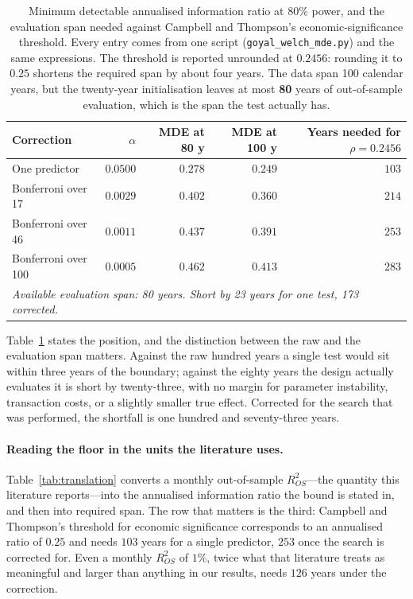 \documentclass{article}
\theoremstyle{plain}
\theoremstyle{definition}
\newcommand{\rsq}{R^2_{OS}}
\begin{document}
\begin{table}[t]
  \centering
  \caption{Minimum detectable annualised information ratio at $80\%$ power, and the evaluation
  span needed against Campbell and Thompson's economic-significance threshold. Every entry comes
  from one script (\texttt{goyal\_welch\_mde.py}) and the same expressions. The threshold is
  reported unrounded at $0.2456$: rounding it to $0.25$ shortens the required span by about four
  years. The data span 100 calendar years, but the twenty-year initialisation leaves at most
  \textbf{80} years of out-of-sample evaluation, which is the span the test actually has.}
  \label{tab:floor}
  \small
  \begin{tabular}{lrrrr}
    \toprule
    Correction & $\alpha$ & MDE at 80 y & MDE at 100 y & Years needed for $\rho=0.2456$ \\
    \midrule
    One predictor                  & $0.0500$ & $0.278$ & $0.249$ & $103$ \\
    Bonferroni over 17 \citep{welch2008} & $0.0029$ & $0.402$ & $0.360$ & $214$ \\
    Bonferroni over 46 \citep{goyal2024} & $0.0011$ & $0.437$ & $0.391$ & $253$ \\
    Bonferroni over 100            & $0.0005$ & $0.462$ & $0.413$ & $283$ \\
    \midrule
    \multicolumn{5}{l}{\emph{Available evaluation span: 80 years. Short by 23 years for one
    test, 173 corrected.}} \\
    \bottomrule
  \end{tabular}
\end{table}

Table~\ref{tab:floor} states the position, and the distinction between the raw and the
evaluation span matters. Against the raw hundred years a single test would sit within three
years of the boundary; against the eighty years the design actually evaluates it is short by
twenty-three, with no margin for parameter instability, transaction costs, or a slightly
smaller true effect. Corrected for the search that was performed, the shortfall is one hundred
and seventy-three years.


\paragraph{Reading the floor in the units the literature uses.} Table~\ref{tab:translation}
converts a monthly out-of-sample $\rsq$---the quantity this literature reports---into the
annualised information ratio the bound is stated in, and then into required span. The row that
matters is the third: Campbell and Thompson's threshold for economic significance corresponds
to an annualised ratio of $0.25$ and needs $103$ years for a single predictor, $253$ once the
search is corrected for. Even a monthly $\rsq$ of $1\%$, twice what that literature treats as
meaningful and larger than anything in our results, needs $126$ years under the correction.
\end{document}
